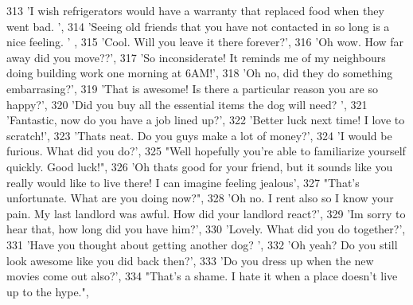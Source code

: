 \begin{DoxyCode}
313                             \textcolor{stringliteral}{'I wish refrigerators would have a warranty that replaced food when they went
       bad. '},
314                             \textcolor{stringliteral}{'Seeing old friends that you have not contacted in so long is a nice feeling. '}
      ,
315                             \textcolor{stringliteral}{'Cool. Will you leave it there forever?'},
316                             \textcolor{stringliteral}{'Oh wow. How far away did you move??'},
317                             \textcolor{stringliteral}{'So inconsiderate! It reminds me of my neighbours doing building work one
       morning at 6AM!'},
318                             \textcolor{stringliteral}{'Oh no, did they do something embarrasing?'},
319                             \textcolor{stringliteral}{'That is awesome!  Is there a particular reason you are so happy?'},
320                             \textcolor{stringliteral}{'Did you buy all the essential items the dog will need? '},
321                             \textcolor{stringliteral}{'Fantastic, now do you have a job lined up?'},
322                             \textcolor{stringliteral}{'Better luck next time!  I love to scratch!'},
323                             \textcolor{stringliteral}{'Thats neat. Do you guys make a lot of money?'},
324                             \textcolor{stringliteral}{'I would be furious.  What did you do?'},
325                             \textcolor{stringliteral}{"Well hopefully you're able to familiarize yourself quickly. Good luck!"},
326                             \textcolor{stringliteral}{'Oh thats good for your friend, but it sounds like you really would like to
       live there! I can imagine feeling jealous'},
327                             \textcolor{stringliteral}{"That's unfortunate.  What are you doing now?"},
328                             \textcolor{stringliteral}{'Oh no. I rent also so I know your pain. My last landlord was awful.  How did
       your landlord react?'},
329                             \textcolor{stringliteral}{'Im sorry to hear that, how long did you have him?'},
330                             \textcolor{stringliteral}{'Lovely.  What did you do together?'},
331                             \textcolor{stringliteral}{'Have you thought about getting another dog? '},
332                             \textcolor{stringliteral}{'Oh yeah?  Do you still look awesome like you did back then?'},
333                             \textcolor{stringliteral}{'Do you dress up when the new movies come out also?'},
334                             \textcolor{stringliteral}{"That's a shame. I hate it when a place doesn't live up to the hype."},

\end{DoxyCode}
